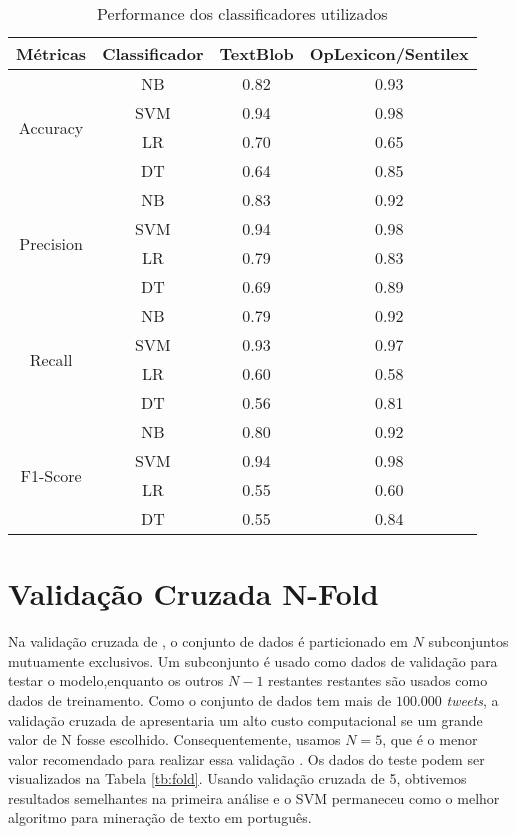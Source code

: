  
 \begin{table}[htbp]
     \centering
     \caption{Performance dos classificadores utilizados}
     \label{tb:metricas}
     \begin{tabular}{@{}cccc@{}}
     \\    \hline
     Métricas & Classificador & TextBlob & OpLexicon/Sentilex \\  \hline
     \multirow{4}{*}{Accuracy} & NB & 0.82 & 0.93 \\  
      & SVM & 0.94 & 0.98 \\ 
      & LR & 0.70 & 0.65 \\
      & DT & 0.64 & 0.85 \\ \hline
     \multirow{4}{*}{Precision} & NB & 0.83 & 0.92 \\ 
      & SVM & 0.94 & 0.98 \\ 
      & LR & 0.79 & 0.83 \\ 
      & DT & 0.69 & 0.89 \\ \hline
     \multirow{4}{*}{Recall} & NB & 0.79 & 0.92 \\ 
      & SVM & 0.93 & 0.97 \\ 
      & LR & 0.60 & 0.58 \\ 
      & DT & 0.56 & 0.81 \\ \hline
     \multirow{4}{*}{F1-Score} & NB & 0.80 & 0.92 \\ 
      & SVM & 0.94 & 0.98 \\ 
      & LR & 0.55 & 0.60 \\ 
      & DT & 0.55 & 0.84 \\ \hline
     \end{tabular}
     \end{table}
     
 \section{Validação Cruzada N-Fold}
 
 Na validação cruzada de , o conjunto de dados é
 particionado em $N$ subconjuntos mutuamente exclusivos.
 Um subconjunto é usado como dados de validação para testar
 o modelo,enquanto os outros $N - 1$ restantes  restantes são usados como
 dados de treinamento. Como o conjunto de dados tem mais
 de $100.000$ \textit{tweets}, a validação cruzada de  apresentaria
 um alto custo computacional se um grande valor de N fosse
 escolhido. Consequentemente, usamos $N = 5$, que é o menor valor recomendado para realizar essa validação \cite{kohavi1995study}. Os dados do
 teste podem ser visualizados na Tabela \ref{tb:fold}.
 Usando validação cruzada de 5, obtivemos resultados
 semelhantes na primeira análise e o SVM permaneceu como
 o melhor algoritmo para mineração de texto em português.
 
